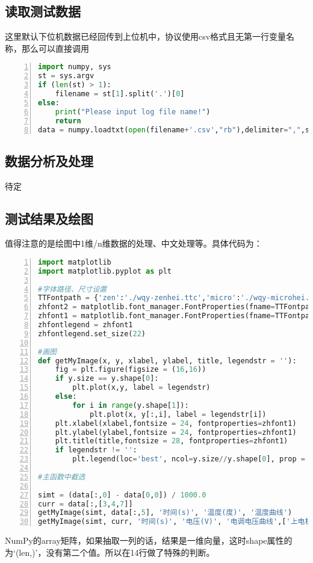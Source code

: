 \subsection{读取测试数据}
这里默认下位机数据已经回传到上位机中，协议使用csv格式且无第一行变量名称，那么可以直接调用
\begin{lstlisting}[language=python,numbers=left,firstnumber = 1,breaklines = true,numberstyle=\tiny,keywordstyle=\color{blue!70},commentstyle=\color{red!50!green!50!blue!50},frame=shadowbox, rulesepcolor=\color{red!20!green!20!blue!20}]
import numpy, sys
st = sys.argv
if (len(st) > 1):
    filename = st[1].split('.')[0]
else:
    print("Please input log file name!")
    return
data = numpy.loadtxt(open(filename+'.csv',"rb"),delimiter=",",skiprows=0) 
\end{lstlisting}

\subsection{数据分析及处理}
待定

\subsection{测试结果及绘图}
值得注意的是绘图中1维/n维数据的处理、中文处理等。具体代码为：
\begin{lstlisting}[language=python,numbers=left,firstnumber = 1,breaklines = true,numberstyle=\tiny,keywordstyle=\color{blue!70},commentstyle=\color{red!50!green!50!blue!50},frame=shadowbox, rulesepcolor=\color{red!20!green!20!blue!20}]
import matplotlib
import matplotlib.pyplot as plt

#字体路径、尺寸设置
TTFontpath = {'zen':'./wqy-zenhei.ttc','micro':'./wqy-microhei.ttc'}
zhfont2 = matplotlib.font_manager.FontProperties(fname=TTFontpath['micro'])
zhfont1 = matplotlib.font_manager.FontProperties(fname=TTFontpath['zen'])
zhfontlegend = zhfont1
zhfontlegend.set_size(22)

#画图
def getMyImage(x, y, xlabel, ylabel, title, legendstr = ''):
    fig = plt.figure(figsize = (16,16))
    if y.size == y.shape[0]:
        plt.plot(x,y, label = legendstr)
    else:
        for i in range(y.shape[1]):
            plt.plot(x, y[:,i], label = legendstr[i])
    plt.xlabel(xlabel,fontsize = 24, fontproperties=zhfont1)
    plt.ylabel(ylabel,fontsize = 24, fontproperties=zhfont1)
    plt.title(title,fontsize = 28, fontproperties=zhfont1)
    if legendstr != '': 
        plt.legend(loc='best', ncol=y.size//y.shape[0], prop = zhfontlegend, shadow=True, fancybox=True).get_frame().set_alpha(0.4)

#主函数中截选

simt = (data[:,0] - data[0,0]) / 1000.0
curr = data[:,[3,4,7]]
getMyImage(simt, data[:,5], '时间(s)', '温度(度)', '温度曲线')
getMyImage(simt, curr, '时间(s)', '电压(V)', '电调电压曲线',['上电机电调电流','下电机电调电流','总电流'])
\end{lstlisting}
NumPy的array矩阵，如果抽取一列的话，结果是一维向量，这时shape属性的为‘(len,)’，没有第二个值。所以在14行做了特殊的判断。

